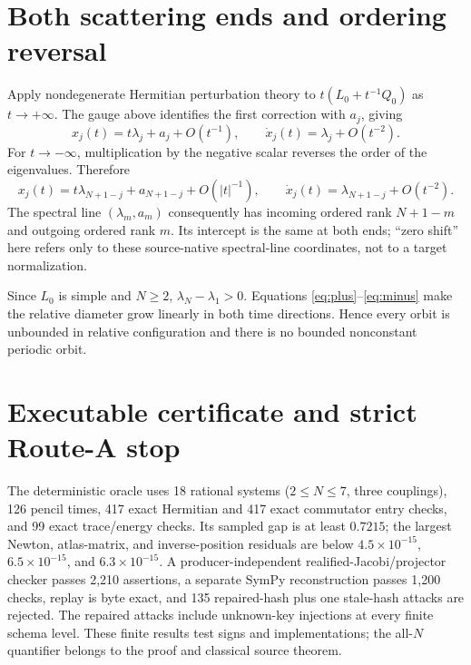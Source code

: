 \documentclass[9pt]{extarticle}
\begin{document}
\section{Both scattering ends and ordering reversal}
Apply nondegenerate Hermitian perturbation theory to
$t(L_0+t^{-1}Q_0)$ as $t\to+\infty$.  The gauge above identifies the first
correction with $a_j$, giving
\begin{equation}\label{eq:plus}
 x_j(t)=t\lambda_j+a_j+O(t^{-1}),\qquad
 \dot x_j(t)=\lambda_j+O(t^{-2}).
\end{equation}
For $t\to-\infty$, multiplication by the negative scalar reverses the order
of the eigenvalues.  Therefore
\begin{equation}\label{eq:minus}
 x_j(t)=t\lambda_{N+1-j}+a_{N+1-j}+O(|t|^{-1}),\qquad
 \dot x_j(t)=\lambda_{N+1-j}+O(t^{-2}).
\end{equation}
The spectral line $(\lambda_m,a_m)$ consequently has incoming ordered rank
$N+1-m$ and outgoing ordered rank $m$.  Its intercept is the same at both
ends; ``zero shift'' here refers only to these source-native spectral-line
coordinates, not to a target normalization.

Since $L_0$ is simple and $N\ge2$, $\lambda_N-\lambda_1>0$.  Equations
\eqref{eq:plus}--\eqref{eq:minus} make the relative diameter grow linearly in
both time directions.  Hence every orbit is unbounded in relative
configuration and there is no bounded nonconstant periodic orbit.

\section{Executable certificate and strict Route-A stop}
The deterministic oracle uses 18 rational systems ($2\le N\le7$, three
couplings), 126 pencil times, 417 exact Hermitian and 417 exact commutator
entry checks, and 99 exact trace/energy checks.  Its sampled gap is at least
$0.7215$; the largest Newton, atlas-matrix, and inverse-position residuals are below
$4.5\times10^{-15}$, $6.5\times10^{-15}$, and $6.3\times10^{-15}$.
A producer-independent realified-Jacobi/projector checker passes 2,210
assertions, a separate SymPy reconstruction passes 1,200 checks, replay is
byte exact, and 135 repaired-hash plus one stale-hash attacks are rejected.
The repaired attacks include unknown-key injections at every finite schema level.
These finite results test signs and implementations; the all-$N$ quantifier
belongs to the proof and classical source theorem.
\end{document}
